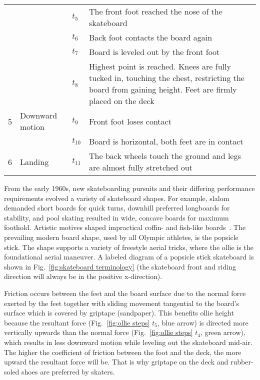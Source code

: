 \documentclass[default,iicol,pdflatex]{sn-jnl}
\begin{document}
\begin{figure*}[!t]
{\begin{center}
\begin{tabular}{p{0.3 cm} p{1.6cm} p{0.3cm} p{12.4cm}}
                  &     & $t_5$ & The front foot reached the nose of the skateboard \\
                   &   & $t_6$ & Back foot contacts the board again \\
                    & & $t_7$ & Board is leveled out by the front foot \\
                    & & $t_8$ & Highest point is reached. Knees are fully tucked in, touching the chest, restricting the board from gaining height. Feet are firmly placed on the deck \\
     5 & Downward motion & $t_9$ & Front foot loses contact \\
         &            & $t_{10}$& Board is horizontal, both feet are in contact \\
     6 & Landing         & $t_{11}$& The back wheels touch the ground and legs are almost fully stretched out \\
 \end{tabular}
 \end{center}
}
  \label{fig:ollie steps}
\end{figure*}

From the early 1960s, new skateboarding pursuits and their differing performance requirements evolved a variety of skateboard shapes.
For example, slalom demanded short boards for quick turns, downhill preferred longboards for stability, and pool skating resulted in wide, concave boards for maximum foothold. 
Artistic motives shaped impractical coffin- and
fish-like boards~\cite{prentiss_get_2011}.
The prevailing modern board shape, used by all Olympic athletes, is the popsicle stick.
The shape supports a variety of freestyle aerial tricks, where the ollie is the foundational aerial maneuver.
A labeled diagram of a popsicle stick skateboard is shown in Fig.~\ref{fig:skateboard terminology} (the skateboard front and riding direction will always be in the positive x-direction).

Friction occurs between the feet and the board surface due to the normal force exerted by the feet together with sliding movement tangential to the board's surface which is covered by griptape (sandpaper).
This benefits ollie height because the resultant force (Fig.~\ref{fig:ollie steps} $t_5$, blue arrow) is directed more vertically upwards than the normal force (Fig.~\ref{fig:ollie steps} $t_4$, green arrow), which results in less downward motion while leveling out the skateboard mid-air.
The higher the coefficient of friction between the foot and the deck, the more upward the resultant force will be.
That is why griptape on the deck and rubber-soled shoes are preferred by skaters.
\end{document}
